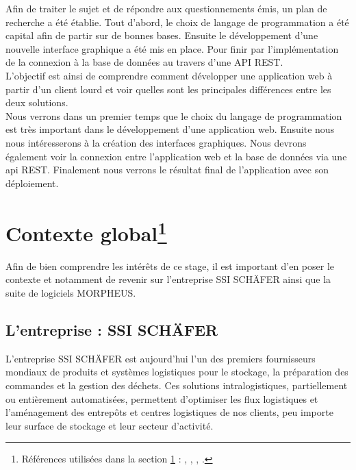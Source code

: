 \documentclass[a4paper, 12pt, french]{article}
\begin{document}
Afin de traiter le sujet et de répondre aux questionnements émis, un plan de recherche a été établie. Tout d’abord, le choix de langage de programmation a été capital afin de partir sur de bonnes bases. Ensuite le développement d’une nouvelle interface graphique a été mis en place. Pour finir par l’implémentation de la connexion à la base de données au travers d’une API REST.\\

L’objectif est ainsi de comprendre comment développer une application web à partir d’un client lourd et voir quelles sont les principales différences entre les deux solutions.\\

Nous verrons dans un premier temps que le choix du langage de programmation est très important dans le développement d’une application web. Ensuite nous nous intéresserons à la création des interfaces graphiques. Nous devrons également voir la connexion entre l’application web et la base de données via une api REST. Finalement nous verrons le résultat final de l’application avec son déploiement.

	\newpage

	
	



	\section{Contexte global\footnote{Références utilisées dans la section \ref{section:context} : \cite{schaefer}, \cite{history}, \cite{schaeferFR}, \cite{schaeferMorpheus}.}}\label{section:context}
	Afin de bien comprendre les intérêts de ce stage, il est important d'en poser le contexte et notamment de revenir sur l'entreprise SSI SCHÄFER ainsi que la suite de logiciels MORPHEUS.
	
		\subsection{L'entreprise : SSI SCHÄFER}
	L'entreprise SSI SCHÄFER est aujourd'hui l'un des premiers fournisseurs mondiaux de produits et systèmes logistiques pour le stockage, la préparation des commandes et la gestion des déchets. Ces solutions intralogistiques, partiellement ou entièrement automatisées, permettent d’optimiser les flux logistiques et l’aménagement des entrepôts et centres logistiques de nos clients, peu importe leur surface de stockage et leur secteur d’activité.
\end{document}
